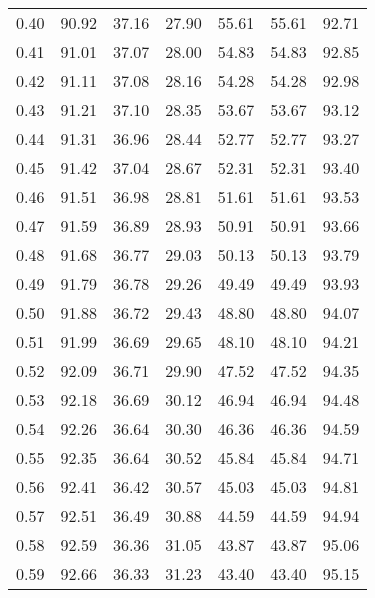 \begin{tabular}{|c|c|c|c|c|c|c|}
      0.40 &     90.92 &     37.16 &      27.90 &   55.61 &      55.61 &         92.71 \\
      0.41 &     91.01 &     37.07 &      28.00 &   54.83 &      54.83 &         92.85 \\
      0.42 &     91.11 &     37.08 &      28.16 &   54.28 &      54.28 &         92.98 \\
      0.43 &     91.21 &     37.10 &      28.35 &   53.67 &      53.67 &         93.12 \\
      0.44 &     91.31 &     36.96 &      28.44 &   52.77 &      52.77 &         93.27 \\
      0.45 &     91.42 &     37.04 &      28.67 &   52.31 &      52.31 &         93.40 \\
      0.46 &     91.51 &     36.98 &      28.81 &   51.61 &      51.61 &         93.53 \\
      0.47 &     91.59 &     36.89 &      28.93 &   50.91 &      50.91 &         93.66 \\
      0.48 &     91.68 &     36.77 &      29.03 &   50.13 &      50.13 &         93.79 \\
      0.49 &     91.79 &     36.78 &      29.26 &   49.49 &      49.49 &         93.93 \\
      0.50 &     91.88 &     36.72 &      29.43 &   48.80 &      48.80 &         94.07 \\
      0.51 &     91.99 &     36.69 &      29.65 &   48.10 &      48.10 &         94.21 \\
      0.52 &     92.09 &     36.71 &      29.90 &   47.52 &      47.52 &         94.35 \\
      0.53 &     92.18 &     36.69 &      30.12 &   46.94 &      46.94 &         94.48 \\
      0.54 &     92.26 &     36.64 &      30.30 &   46.36 &      46.36 &         94.59 \\
      0.55 &     92.35 &     36.64 &      30.52 &   45.84 &      45.84 &         94.71 \\
      0.56 &     92.41 &     36.42 &      30.57 &   45.03 &      45.03 &         94.81 \\
      0.57 &     92.51 &     36.49 &      30.88 &   44.59 &      44.59 &         94.94 \\
      0.58 &     92.59 &     36.36 &      31.05 &   43.87 &      43.87 &         95.06 \\
      0.59 &     92.66 &     36.33 &      31.23 &   43.40 &      43.40 &         95.15 \\

\end{tabular}
